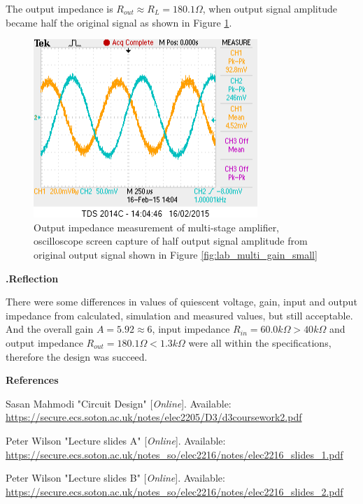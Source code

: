 \documentclass[a4paper,notitlepage,10pt]{report}
\newcommand{\tab}{\hspace{0.75cm}}
\newcommand{\fontHeading}{\fontsize{12pt}{13.2pt}\selectfont}
\newcommand{\fontBody}{\fontsize{10pt}{11pt}\selectfont}
\newcommand{\fontRef}{\fontsize{9pt}{9.9pt}\selectfont}
\newcounter{sections}
\begin{document}
\begin{multicols}{2}
The output impedance is $R_{out} \approx R_L = 180.1\Omega$, when output signal amplitude became half the original signal as shown in Figure \ref{fig:lab_multi_rout}.
\parskip=0pt

\begin{figure}[H]
	\centering
	\includegraphics[width=0.85\columnwidth]{labmultirout}
	\caption{Output impedance measurement of multi-stage amplifier, oscilloscope screen capture of half output signal amplitude from original output signal shown in Figure \ref{fig:lab_multi_gain_small}}
	\label{fig:lab_multi_rout}
\end{figure}
\parskip=10pt


\fontHeading
{}
\textbf{.\tab Reflection}

\parskip=6pt
\fontBody
There were some differences in values of quiescent voltage, gain, input and output impedance from calculated, simulation and measured values, but still acceptable. And the overall gain $A = 5.92 \approx 6$, input impedance $R_{in} = 60.0k\Omega > 40k\Omega$ and output impedance $R_{out} = 180.1\Omega < 1.3k\Omega$ were all within the specifications, therefore the design was succeed.
\parskip=10pt

\fontHeading
\textbf{References}

\fontRef
\begin{enumerate}[label={[\arabic*]},align=left,leftmargin=0.7cm,labelwidth=!,topsep=0pt,partopsep=0pt,parsep=0pt,itemsep=0pt]
\item
\label{ref:cktdsn}
Sasan Mahmodi "Circuit Design" [\textit{Online}]. Available: \url{https://secure.ecs.soton.ac.uk/notes/elec2205/D3/d3coursework2.pdf}
\item
\label{ref:sli_a}
Peter Wilson "Lecture slides A" [\textit{Online}]. Available: \url{https://secure.ecs.soton.ac.uk/notes_so/elec2216/notes/elec2216_slides_1.pdf}
\item
\label{ref:sli_b}
Peter Wilson "Lecture slides B" [\textit{Online}]. Available: \url{https://secure.ecs.soton.ac.uk/notes_so/elec2216/notes/elec2216_slides_2.pdf}
\end{enumerate}
\end{multicols}
\end{document}
